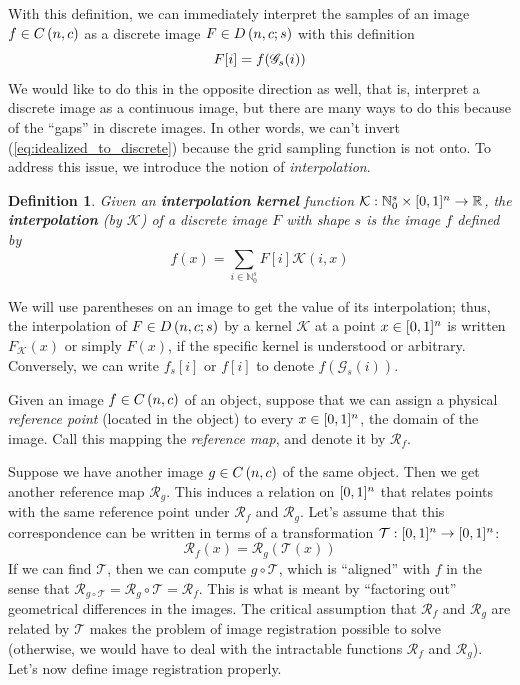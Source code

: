 \documentclass{article}
\newcommand{\R}{\mathbb{R}}
\newcommand{\Natural}{\mathbb{N}}
\newtheorem{defn}{Definition}
\begin{document}
	With this definition, we can immediately interpret the samples of an image \(f \in {C\left(n, c\right)}\) as a discrete image \(F \in {D\left(n, c; s\right)}\) with this definition
	\begin{equation}\label{eq:idealized_to_discrete}
		F[i] = f(\mathscr{G}_s(i))
	\end{equation}
	We would like to do this in the opposite direction as well, that is, interpret a discrete image as a continuous image, but there are many ways to do this because of the ``gaps'' in discrete images. In other words, we can't invert (\ref{eq:idealized_to_discrete}) because the grid sampling function is not onto. To address this issue, we introduce the notion of \textit{interpolation}.
	\newcommand{\kernel}{\mathcal{K}}
	\begin{defn}\label{def:interpolation}
		Given an \textbf{interpolation kernel} function \(\kernel: \Natural_0^s \times \unitcube \to \R\), the \textbf{interpolation} (by \(\kernel\)) of a discrete image \(F\) with shape \(s\) is the image \(f\) defined by
		\begin{equation}\label{eq:interpolation}
			f(x) = \sum_{i \in \Natural_0^s} F[i]\kernel(i, x)
		\end{equation}
	\end{defn}
	We will use parentheses on an image to get the value of its interpolation; thus, the interpolation of \(F \in {D\left(n, c; s\right)}\) by a kernel \(\kernel\) at a point \(x\in {[0,1]^{n}}\) is written \(F_\kernel(x)\) or simply \(F(x)\), if the specific kernel is understood or arbitrary. Conversely, we can write \(f_s[i]\) or \(f[i]\) to denote \(f(\mathcal{G}_s(i))\).
	
	Given an image \(f\in{C\left(n, c\right)}\) of an object, suppose that we can assign a physical \textit{reference point} (located in the object) to every \(x \in {[0,1]^{n}}\), the domain of the image. Call this mapping the \textit{reference map}, and denote it by \(\mathcal{R}_f\).
	
	\newcommand{\transf}{\mathcal{T}}
	Suppose we have another image \(g \in {C\left(n, c\right)}\) of the same object. Then we get another reference map \(\mathcal{R}_g\). This induces a relation on \({[0,1]^{n}}\) that relates points with the same reference point under \(\mathcal{R}_f\) and \(\mathcal{R}_g\). Let's assume that this correspondence can be written in terms of a transformation \(\transf: \unitcube\to\unitcube\):
	\begin{equation*}
		\mathcal{R}_f(x) = \mathcal{R}_g(\transf(x))
	\end{equation*}
	If we can find \(\transf\), then we can compute \(g \circ \transf\), which is ``aligned'' with \(f\) in the sense that \(\mathcal{R}_{g\circ\transf} = \mathcal{R}_g\circ\transf = \mathcal{R}_f\). This is what is meant by ``factoring out'' geometrical differences in the images. The critical assumption that \(\mathcal{R}_f\) and \(\mathcal{R}_g\) are related by \(\transf\) makes the problem of image registration possible to solve (otherwise, we would have to deal with the intractable functions \(\mathcal{R}_f\) and \(\mathcal{R}_g\)). Let's now define image registration properly.
	
\end{document}
